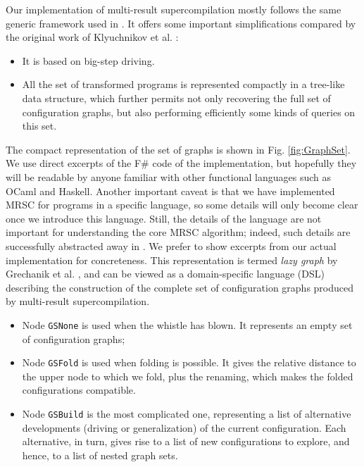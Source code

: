 \documentclass[submission,copyright,creativecommons]{eptcs}
\begin{document}
Our implementation of multi-result supercompilation mostly follows the same
generic framework used in \cite{Romanenko2014StagedMRSC,krustev2014approach}.
It offers some important simplifications compared by the original work
of Klyuchnikov et al. \cite{KlyuchnikovMRSCBranch,Klyuchnikov:META2012:MRSC}:
\begin{itemize}
  \item It is based on big-step driving.
  \item All the set of transformed programs is represented compactly
    in a tree-like data structure, which further permits not only
    recovering the full set of configuration graphs, but also
    performing efficiently some kinds of queries on this set.
\end{itemize}
The compact representation of the set of graphs is shown in Fig. \ref{fig:GraphSet}.
We use direct excerpts of the F\# code of the implementation, but hopefully
they will be readable by anyone familiar with other functional languages such as OCaml and Haskell.
Another important caveat is that we have implemented MRSC for programs in a specific language,
so some details will only become clear once we introduce this language.
Still, the details of the language are not important for understanding the core
MRSC algorithm; indeed, such details are successfully abstracted away in \cite{Romanenko2014StagedMRSC,krustev2014approach}.
We prefer to show excerpts from our actual implementation for concreteness.
This representation is termed \emph{lazy graph} by Grechanik et al. \cite{Romanenko2014StagedMRSC},
and can be viewed as a domain-specific language (DSL) describing the construction of the
complete set of configuration graphs produced by multi-result supercompilation.
\begin{itemize}
  \item Node \verb|GSNone| is used when the whistle has blown. 
    It represents an empty set of configuration graphs;
  \item Node \verb|GSFold| is used when folding is possible. 
    It gives the relative distance to the upper node to which we fold, 
    plus the renaming, which makes the folded configurations compatible.
  \item Node \verb|GSBuild| is the most complicated one, representing a list
    of alternative developments (driving or generalization) of the current configuration.
    Each alternative, in turn, gives rise to a list of new configurations to explore,
    and hence, to a list of nested graph sets.
\end{itemize}
\end{document}
